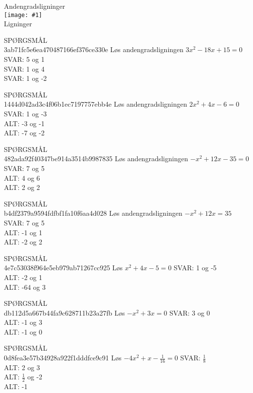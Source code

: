 \documentclass[]{article}
\newcounter{spgcounter}
\newenvironment{question}[2]{\addtocounter{spgcounter}{1} SPØRGSMÅL \thespgcounter\\}{\hspace{50px}}
\newcommand{\name}[1]{{\huge #1}\\}
\newcommand{\tag}[1]{#1}
\newcommand{\cover}[1]{\texttt{[image: \#1]}\\}
\newcommand{\answer}[1]{{\color{green} SVAR: #1}\\}
\newcommand{\alt}[1]{{\color{red} ALT: #1}\\}
\begin{document}
\name{Andengradsligninger}
\cover{andengradsligninger.png}
\tag{Ligninger}

\begin{question}{multi}\id{3ab71fc5e6ea470487166ef376ce330e}
Løs andengradsligningen $3x^2 -18x+15=0$
\answer{5 og 1}
\answer{1 og 4}
\answer{1 og -2}
\end{question}

\begin{question}{multi}\id{1444d042ad3c4f06b1ec7197757ebb4e}
Løs andengradsligningen $2x^2+4x-6=0$
\answer{1 og -3}
\alt{-3 og -1}
\alt{-7 og -2}
\end{question}

\begin{question}{multi}\id{482ada92f40347be914a3514b9987835}
Løs andengradsligningen $-x^2+12x-35=0$
\answer{7 og 5}
\alt{4 og 6}
\alt{2 og 2}
\end{question}

\begin{question}{multi}\id{b4df2379a9594fdfbf1fa10f6aa4d028}
Løs andengradsligningen $-x^2+12x=35$
\answer{7 og 5}
\alt{-1 og 1}
\alt{-2 og 2}
\end{question}

\begin{question}{multi}\id{4e7c53038f964e5eb979ab71267cc925}
Løs $x^2+4x-5=0$
\answer{1 og -5}
\alt{-2 og 1}
\alt{-64 og 3}
\end{question}

\begin{question}{multi}\id{db112d5a667b44fa9c628711b23a27fb}
Løs $-x^2+3x=0$
\answer{3 og 0}
\alt{-1 og 3}
\alt{-1 og 0}
\end{question}

\begin{question}{multi}\id{0d8fea3e57b34928a922f1dddfce9c91}
Løs $-4x^2+x-\frac{1}{16}=0$
\answer{$\frac{1}{8}$}
\alt{2 og 3}
\alt{$\frac{1}{2}$ og -2}
\alt{-1}
\end{question}
    
\end{document}
